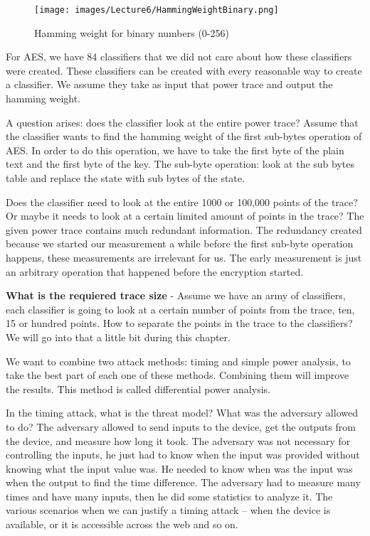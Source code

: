 \begin{figure}[!ht]
    \centering
    \texttt{[image: images/Lecture6/HammingWeightBinary.png]}
    \caption{Hamming weight for binary numbers (0-256)} \label{fig:HammingWeightBinary }
\end{figure}

For AES, we have 84 classifiers that we did not care about how these classifiers were created.
These classifiers can be created with every reasonable way to create a classifier.
We assume they take as input that power trace and output the hamming weight. 

A question arises: does the classifier look at the entire power trace?
Assume that the classifier wants to find the hamming weight of the first sub-bytes operation of AES.
In order to do this operation, we have to take the first byte of the plain text and the first byte of the key.
The sub-byte operation: look at the sub bytes table and replace the state with sub bytes of the state. 

Does the classifier need to look at the entire 1000 or 100,000 points of the trace?
Or maybe it needs to look at a certain limited amount of points in the trace?
The given power trace contains much redundant information.
The redundancy created because we started our measurement a while before the first sub-byte operation happens, these measurements are irrelevant for us.
The early measurement is just an arbitrary operation that happened before the encryption started.

\textbf{What is the requiered trace size} -
Assume we have an army of classifiers, each classifier is going to look at a certain number of points from the trace, ten, 15 or hundred points.
How to separate the points in the trace to the classifiers?
We will go into that a little bit during this chapter. 

We want to combine two attack methods: timing and simple power analysis, to take the best part of each one of these methods.
Combining them will improve the results.
This method is called differential power analysis.

In the timing attack, what is the threat model? 
What was the adversary allowed to do? 
The adversary allowed to send inputs to the device, 
get the outputs from the device, 
and measure how long it took.
The adversary was not necessary for controlling the inputs, 
he just had to know when the input was provided without knowing what the input value was.
He needed to know when was the input was when the output to find the time difference. 
The adversary had to measure many times and have many inputs, 
then he did some statistics to analyze it.
The various scenarios when we can justify a timing attack – when the device is available, or it is accessible across the web and so on.

